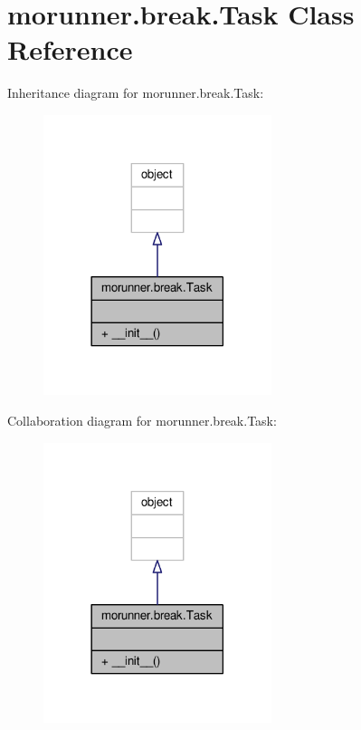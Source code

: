 \hypertarget{classmorunner_1_1break_1_1Task}{}\section{morunner.\+break.\+Task Class Reference}
\label{classmorunner_1_1break_1_1Task}


Inheritance diagram for morunner.\+break.\+Task\+:
\nopagebreak
\begin{figure}[H]
\begin{center}
\leavevmode
\includegraphics[width=189pt]{classmorunner_1_1break_1_1Task__inherit__graph}
\end{center}
\end{figure}


Collaboration diagram for morunner.\+break.\+Task\+:
\nopagebreak
\begin{figure}[H]
\begin{center}
\leavevmode
\includegraphics[width=189pt]{classmorunner_1_1break_1_1Task__coll__graph}
\end{center}
\end{figure}
